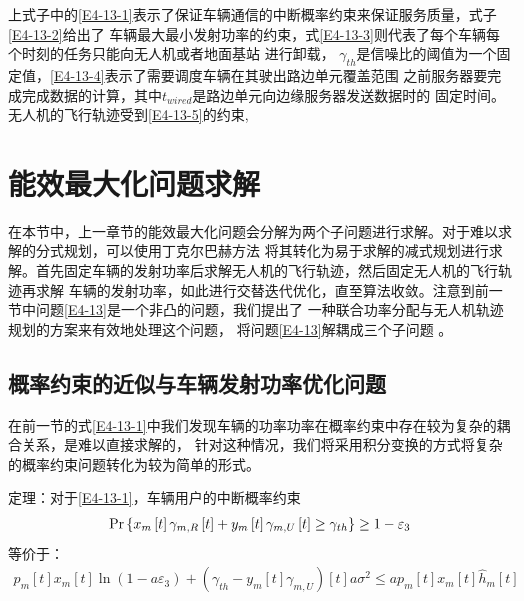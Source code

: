 上式子中的\eqref{E4-13-1}表示了保证车辆通信的中断概率约束来保证服务质量，式子\eqref{E4-13-2}给出了
车辆最大最小发射功率的约束，式\eqref{E4-13-3}则代表了每个车辆每个时刻的任务只能向无人机或者地面基站
进行卸载，
 $\gamma_{th}$是信噪比的阈值为一个固定值，\eqref{E4-13-4}表示了需要调度车辆在其驶出路边单元覆盖范围
之前服务器要完成完成数据的计算，其中$t_{wired}$是路边单元向边缘服务器发送数据时的
固定时间。无人机的飞行轨迹受到\eqref{E4-13-5}的约束,


\section{能效最大化问题求解}\label{section4-3}
在本节中，上一章节的能效最大化问题会分解为两个子问题进行求解。对于难以求解的分式规划，可以使用丁克尔巴赫方法
将其转化为易于求解的减式规划进行求解。首先固定车辆的发射功率后求解无人机的飞行轨迹，然后固定无人机的飞行轨迹再求解
车辆的发射功率，如此进行交替迭代优化，直至算法收敛。注意到前一节中问题\eqref{E4-13}是一个非凸的问题，我们提出了
一种联合功率分配与无人机轨迹规划的方案来有效地处理这个问题，
将问题\eqref{E4-13}解耦成三个子问题 \cite{JointTrajectory9627548}。
\subsection{概率约束的近似与车辆发射功率优化问题}\label{section4-3-1}
在前一节的式\eqref{E4-13-1}中我们发现车辆的功率功率在概率约束中存在较为复杂的耦合关系，是难以直接求解的，
针对这种情况，我们将采用积分变换的方式将复杂的概率约束问题转化为较为简单的形式。

定理：对于\eqref{E4-13-1}，车辆用户的中断概率约束
\begin{align}
\Pr\left\{x_m\left[t\right]\gamma_{m,R}\left[t\right]+y_m\left[t\right]\gamma_{m,U}\left[t\right] \geq \gamma_{th}\right\}\geq1-\varepsilon_3    \notag
\end{align}
等价于：
\begin{equation} \label{E4-14}
\begin{gathered}
p_m\left[t\right]x_m\left[t\right]\ln \left(1-a \varepsilon_3\right)+(\gamma_{th}-y_m\left[t\right]\gamma_{m,U})\left[t\right] a \sigma^2
\leq a p_m\left[t\right]x_m\left[t\right]\hat{h}_{m}\left[t\right]
\end{gathered}
\end{equation}


